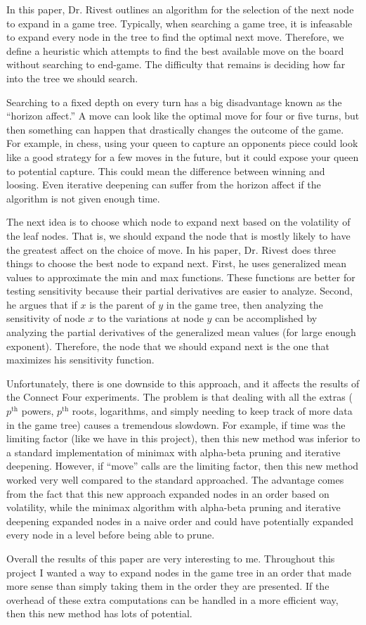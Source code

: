 \documentclass{article}
\begin{document}
In this paper, Dr. Rivest outlines an algorithm for the selection of the next node to expand in a game tree. Typically, when searching a game tree, it is infeasable to expand every node in the tree to find the optimal next move. Therefore, we define a heuristic which attempts to find the best available move on the board without searching to end-game. The difficulty that remains is deciding how far into the tree we should search.

Searching to a fixed depth on every turn has a big disadvantage known as the ``horizon affect.'' A move can look like the optimal move for four or five turns, but then something can happen that drastically changes the outcome of the game. For example, in chess, using your queen to capture an opponents piece could look like a good strategy for a few moves in the future, but it could expose your queen to potential capture. This could mean the difference between winning and loosing. Even iterative deepening can suffer from the horizon affect if the algorithm is not given enough time.

The next idea is to choose which node to expand next based on the volatility of the leaf nodes. That is, we should expand the node that is mostly likely to have the greatest affect on the choice of move. In his paper, Dr. Rivest does three things to choose the best node to expand next. First, he uses generalized mean values to approximate the min and max functions. These functions are better for testing sensitivity because their partial derivatives are easier to analyze. Second, he argues that if $x$ is the parent of $y$ in the game tree, then analyzing the sensitivity of node $x$ to the variations at node $y$ can be accomplished by analyzing the partial derivatives of the generalized mean values (for large enough exponent). Therefore, the node that we should expand next is the one that maximizes his sensitivity function.

Unfortunately, there is one downside to this approach, and it affects the results of the Connect Four experiments. The problem is that dealing with all the extras ($p^\text{th}$ powers, $p^\text{th}$ roots, logarithms, and simply needing to keep track of more data in the game tree) causes a tremendous slowdown. For example, if time was the limiting factor (like we have in this project), then this new method was inferior to a standard implementation of minimax with alpha-beta pruning and iterative deepening. However, if ``move'' calls are the limiting factor, then this new method worked very well compared to the standard approached. The advantage comes from the fact that this new approach expanded nodes in an order based on volatility, while the minimax algorithm with alpha-beta pruning and iterative deepening expanded nodes in a naive order and could have potentially expanded every node in a level before being able to prune.

Overall the results of this paper are very interesting to me. Throughout this project I wanted a way to expand nodes in the game tree in an order that made more sense than simply taking them in the order they are presented. If the overhead of these extra computations can be handled in a more efficient way, then this new method has lots of potential.
\end{document}
